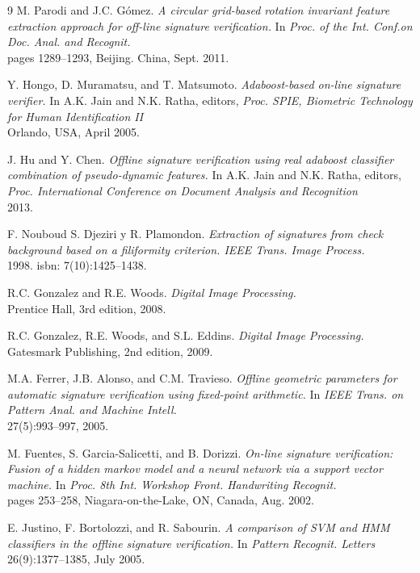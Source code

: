 \begin{thebibliography}{9}
M. Parodi and J.C. Gómez.
\textit{ A circular grid-based rotation invariant feature extraction approach for off-line signature verification. } In \textit{Proc. of the Int. Conf.on Doc. Anal. and Recognit.} \\
pages 1289–1293, Beijing. China, Sept. 2011.

Y. Hongo, D. Muramatsu, and T. Matsumoto.
\textit{ Adaboost-based on-line signature verifier.} In A.K. Jain and N.K.
Ratha, editors, \textit{Proc. SPIE, Biometric Technology for Human Identification II} \\
Orlando, USA, April 2005.

J. Hu and Y. Chen.
\textit{ Offline signature verification using real adaboost classifier combination of pseudo-dynamic features. } In A.K. Jain and N.K.
Ratha, editors, \textit{ Proc. International Conference on Document Analysis and Recognition } \\
2013.

F. Nouboud S. Djeziri y R. Plamondon.
\textit{ Extraction of signatures from check background based on a filiformity criterion. IEEE Trans. Image Process. } \\
1998. isbn: 7(10):1425–1438.

R.C. Gonzalez and R.E. Woods.
\textit{ Digital Image Processing. } \\
Prentice Hall, 3rd edition, 2008.

R.C. Gonzalez, R.E. Woods, and S.L. Eddins.
\textit{ Digital Image Processing. } \\
Gatesmark Publishing, 2nd edition, 2009.

M.A. Ferrer, J.B. Alonso, and C.M. Travieso.
\textit{ Offline geometric parameters for automatic signature verification using fixed-point arithmetic. } In \textit{IEEE Trans. on Pattern Anal. and Machine Intell.} \\
27(5):993–997, 2005.

M. Fuentes, S. Garcia-Salicetti, and B. Dorizzi.
\textit{ On-line signature verification: Fusion of a hidden markov model and a neural network via a support vector machine. } In \textit{Proc. 8th Int. Workshop Front. Handwriting Recognit.} \\
pages 253–258, Niagara-on-the-Lake, ON, Canada, Aug. 2002.

E. Justino, F. Bortolozzi, and R. Sabourin.
\textit{ A comparison of SVM and HMM classifiers in the offline signature verification. } In \textit{Pattern Recognit. Letters} \\
26(9):1377–1385, July 2005.


\end{thebibliography}
